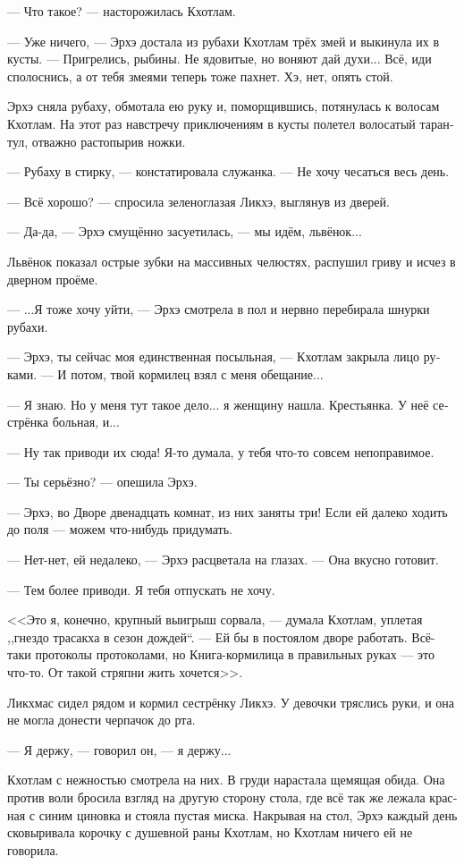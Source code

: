 \documentclass[a4paper,12pt,fleqn]{book}\usepackage{cooltooltips}\usepackage{polyglossia}\setdefaultlanguage[babelshorthands=true]{russian}\setotherlanguage{english}\defaultfontfeatures{Ligatures=TeX,Mapping=tex-text} \usepackage{xcolor}\definecolor{lightgray}{HTML}{bbbbbb}\color{lightgray}\newcommand{\ml}[3]{\textenglish{\textcolor{black}{#3}} }
\begin{document}
--- Что такое? --- насторожилась Кхотлам.

--- Уже ничего, --- Эрхэ достала из рубахи Кхотлам трёх змей и выкинула их в кусты.
--- Пригрелись, рыбины.
Не ядовитые, но воняют дай духи...
Всё, иди сполоснись, а от тебя змеями теперь тоже пахнет.
Хэ, нет, опять стой.

Эрхэ сняла рубаху, обмотала ею руку и, поморщившись, потянулась к волосам Кхотлам.
На этот раз навстречу приключениям в кусты полетел волосатый тарантул, отважно растопырив ножки.

--- Рубаху в стирку, --- констатировала служанка.
--- Не хочу чесаться весь день.

--- Всё хорошо? --- спросила зеленоглазая Ликхэ, выглянув из дверей.

--- Да-да, --- Эрхэ смущённо засуетилась, --- мы идём, львёнок...

Львёнок показал острые зубки на массивных челюстях, распушил гриву и исчез в дверном проёме.

--- ...Я тоже хочу уйти, --- Эрхэ смотрела в пол и нервно перебирала шнурки рубахи.

--- Эрхэ, ты сейчас моя единственная посыльная, --- Кхотлам закрыла лицо руками.
--- И потом, твой кормилец взял с меня обещание...

--- Я знаю.
Но у меня тут такое дело... я женщину нашла.
Крестьянка.
У неё сестрёнка больная, и...

--- Ну так приводи их сюда!
Я-то думала, у тебя что-то совсем непоправимое.

--- Ты серьёзно? --- опешила Эрхэ.

--- Эрхэ, во Дворе двенадцать комнат, из них заняты три!
Если ей далеко ходить до поля --- можем что-нибудь придумать.

--- Нет-нет, ей недалеко, --- Эрхэ расцветала на глазах.
--- Она вкусно готовит.

--- Тем более приводи.
Я тебя отпускать не хочу.

<<Это я, конечно, крупный выигрыш сорвала, --- думала Кхотлам, уплетая ,,гнездо трасакха в сезон дождей``.
--- Ей бы в постоялом дворе работать.
Всё-таки протоколы протоколами, но Книга-кормилица в правильных руках --- это что-то.
От такой стряпни жить хочется>>.

Ликхмас сидел рядом и кормил сестрёнку Ликхэ.
У девочки тряслись руки, и она не могла донести черпачок до рта.

--- Я держу, --- говорил он, --- я держу...

Кхотлам с нежностью смотрела на них.
В груди нарастала щемящая обида.
Она против воли бросила взгляд на другую сторону стола, где всё так же лежала красная с синим циновка и стояла пустая миска.
Накрывая на стол, Эрхэ каждый день сковыривала корочку с душевной раны Кхотлам, но Кхотлам ничего ей не говорила.
\end{document}
